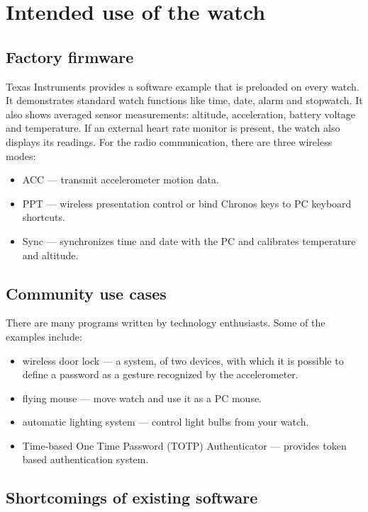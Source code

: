 \section{Intended use of the watch}
\label{ch:intended_use_of_watch}

\subsection{Factory firmware}

Texas Instruments provides a software example that is preloaded on every
watch. It demonstrates standard watch functions like time, date, alarm and
stopwatch. It also shows averaged sensor measurements: altitude,
acceleration, battery voltage and temperature. If an external  heart
rate monitor is present, the watch also displays its readings. For
the radio communication, there are three wireless modes:

\begin{itemize}
  \item ACC --- transmit accelerometer motion data.
  \item PPT --- wireless presentation control or bind Chronos
    keys to PC keyboard shortcuts.
  \item Sync --- synchronizes time and date with the PC and calibrates
    temperature and altitude.
\end{itemize}

\subsection{Community use cases}
There are many programs written by technology enthusiasts. Some of the
examples include:

\begin{itemize}
  \item wireless door lock --- a system, of two devices, with which it
    is possible to define a password as a gesture recognized by the
    accelerometer.
  \item flying mouse --- move watch and use it as a PC mouse.
  \item automatic lighting system --- control light bulbs from your
    watch.
  \item Time-based One Time Password (TOTP) Authenticator --- provides
    token based authentication system.
\end{itemize}

\subsection{Shortcomings of existing software}


